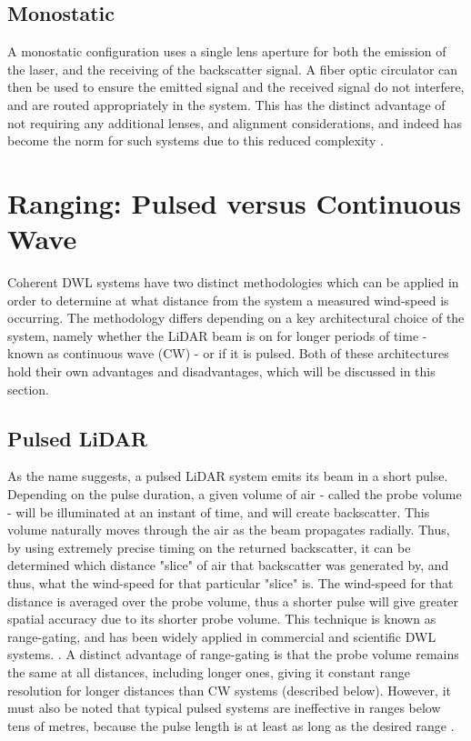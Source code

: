     \subsection{Monostatic}
    A monostatic configuration uses a single lens aperture for both the emission of the laser, and the receiving of the backscatter signal. A fiber optic circulator can then be used to ensure the emitted signal and the received signal do not interfere, and are routed appropriately in the system. This has the distinct advantage of not requiring any additional lenses, and alignment considerations, and indeed has become the norm for such systems due to this reduced complexity \cite{hill_remote_nodate}.  
        

    \section{Ranging: Pulsed versus Continuous Wave}
    \label{sec:lit-Ranging}
    Coherent DWL systems have two distinct methodologies which can be applied in order to determine at what distance from the system a measured wind-speed is occurring. The methodology differs depending on a key architectural choice of the system, namely whether the LiDAR beam is on for longer periods of time - known as continuous wave (CW) - or if it is pulsed. Both of these architectures hold their own advantages and disadvantages, which will be discussed in this section.

    \subsection{Pulsed LiDAR}
    As the name suggests, a pulsed LiDAR system emits its beam in a short pulse. Depending on the pulse duration, a given volume of air - called the probe volume - will be illuminated at an instant of time, and will create backscatter. This volume naturally moves through the air as the beam propagates radially. Thus, by using extremely precise timing on the returned backscatter, it can be determined which distance "slice" of air that backscatter was generated by, and thus, what the wind-speed for that particular "slice" is. The wind-speed for that distance is averaged over the probe volume, thus a shorter pulse will give greater spatial accuracy due to its shorter probe volume. This technique is known as range-gating, and has been widely applied in commercial and scientific DWL systems. \cite{cariou_leosphere_nodate} \cite{wagner_power_2014} \cite{letizia_characterization_2023}. A distinct advantage of range-gating is that the probe volume remains the same at all distances, including longer ones, giving it constant range resolution for longer distances than CW systems \cite{cariou_leosphere_nodate} (described below). However, it must also be noted that typical pulsed systems are ineffective in ranges below tens of metres, because the pulse length is at least as long as the desired range \cite{hill_remote_nodate}. 

